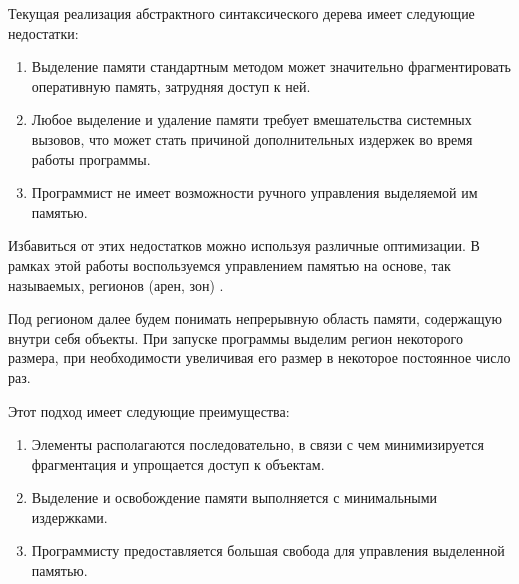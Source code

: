 Текущая реализация абстрактного синтаксического дерева имеет следующие
недостатки:
\begin{enumerate}
    \item Выделение памяти стандартным методом может значительно
    фрагментировать оперативную память, затрудняя доступ к ней.
    \item Любое выделение и удаление памяти требует вмешательства системных
    вызовов, что может стать причиной дополнительных издержек во время
    работы программы.
    \item Программист не имеет возможности ручного управления выделяемой им
    памятью.
\end{enumerate}

Избавиться от этих недостатков можно используя различные оптимизации. В рамках
этой работы воспользуемся управлением памятью на основе, так называемых,
регионов (арен, зон) \cite{wangmemory}.

Под регионом далее будем понимать непрерывную область памяти, содержащую внутри
себя объекты. При запуске программы выделим регион некоторого размера, при
необходимости увеличивая его размер в некоторое постоянное число раз.

Этот подход имеет следующие преимущества:
\begin{enumerate}
    \item Элементы располагаются последовательно, в связи с чем минимизируется
    фрагментация и упрощается доступ к объектам.
    \item Выделение и освобождение памяти выполняется с минимальными
    издержками.
    \item Программисту предоставляется большая свобода для управления
    выделенной памятью.
\end{enumerate}